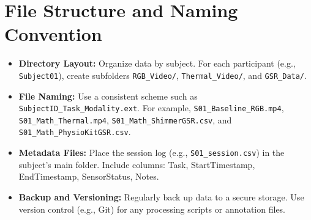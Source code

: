 \section{File Structure and Naming Convention}
\begin{itemize}
    \item \textbf{Directory Layout:} Organize data by subject. For each participant (e.g., \texttt{Subject01}), create subfolders \texttt{RGB\_Video/}, \texttt{Thermal\_Video/}, and \texttt{GSR\_Data/}.
    \item \textbf{File Naming:} Use a consistent scheme such as \texttt{SubjectID\_Task\_Modality.ext}. For example, \texttt{S01\_Baseline\_RGB.mp4}, \texttt{S01\_Math\_Thermal.mp4}, \texttt{S01\_Math\_ShimmerGSR.csv}, and \texttt{S01\_Math\_PhysioKitGSR.csv}.
    \item \textbf{Metadata Files:} Place the session log (e.g., \texttt{S01\_session.csv}) in the subject’s main folder. Include columns: Task, StartTimestamp, EndTimestamp, SensorStatus, Notes.
    \item \textbf{Backup and Versioning:} Regularly back up data to a secure storage. Use version control (e.g., Git) for any processing scripts or annotation files.
\end{itemize}
